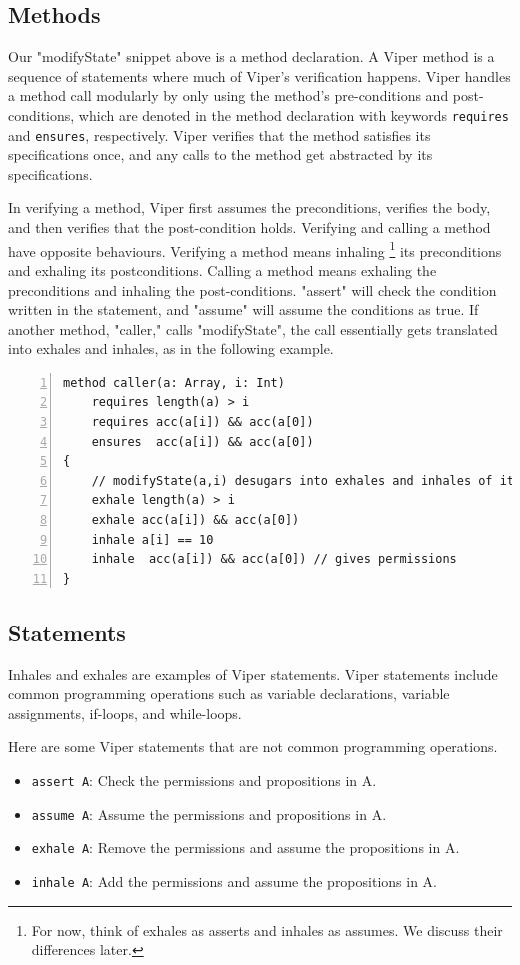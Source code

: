 \documentclass[msc,oneside]{ubcthesis}
\theoremstyle{definition}
\begin{document}
\subsection{Methods}
Our "modifyState" snippet above is a method declaration. A Viper method is a sequence of statements where much of Viper's verification happens. Viper handles a method call modularly by only using the method's pre-conditions and post-conditions, which are denoted in the method declaration with keywords \lstinline{requires} and \lstinline{ensures}, respectively. Viper verifies that the method satisfies its specifications once, and any calls to the method get abstracted by its specifications.

In verifying a method, Viper first assumes the preconditions, verifies the body, and then verifies that the post-condition holds. Verifying and calling a method have opposite behaviours. Verifying a method means inhaling \footnote{For now, think of exhales as asserts and inhales as assumes. We discuss their differences later.} its preconditions and exhaling its postconditions. Calling a method means exhaling the preconditions and inhaling the post-conditions.  "assert" will check the condition written in the statement, and "assume" will assume the conditions as true. If another method, "caller," calls "modifyState", the call essentially gets translated into exhales and inhales, as in the following example.
\begin{lstlisting}[language=silver,numbers=left, firstnumber=1, stepnumber=1]
method caller(a: Array, i: Int)
    requires length(a) > i
    requires acc(a[i]) && acc(a[0])
    ensures  acc(a[i]) && acc(a[0])
{
    // modifyState(a,i) desugars into exhales and inhales of its specifications.
    exhale length(a) > i
    exhale acc(a[i]) && acc(a[0])
    inhale a[i] == 10
    inhale  acc(a[i]) && acc(a[0]) // gives permissions
}
\end{lstlisting}

\subsection{Statements}
Inhales and exhales are examples of Viper statements. Viper statements include common programming operations such as variable declarations, variable assignments, if-loops, and while-loops. 

Here are some Viper statements that are not common programming operations.
\begin{itemize}
    \item \lstinline{assert A}: Check the permissions and propositions in A.
    \item \lstinline{assume A}: Assume the permissions and propositions in A.
    \item \lstinline{exhale A}: Remove the permissions and assume the propositions in A. 
    \item \lstinline{inhale A}: Add the permissions and assume the propositions in A.
\end{itemize}
\end{document}
